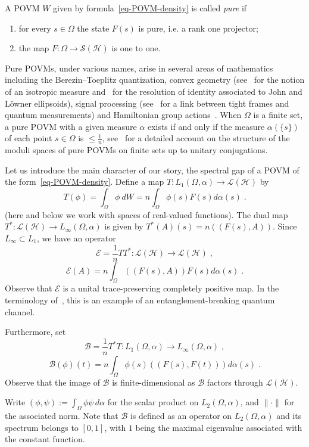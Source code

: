 \documentclass[11pt]{article}
\theoremstyle{definition}
\numberwithin{equation}{section}
\numberwithin{figure}{section}
\numberwithin{table}{section}
\newcommand{\cB}{{\mathcal{B}}}
\newcommand{\cE}{{\mathcal{E}}}
\newcommand{\cS}{{\mathcal{S}}}
\newcommand{\Hilb}{\mathcal{H}}
\renewcommand\leq {\leqslant}
\newcommand\< {\mathcal{h}}
\renewcommand\> {\mathcal{i}}
\newcommand*\cL{\mathscr{L}}
\newcommand*{\romanenumi}{\renewcommand*{\theenumi}{\roman{enumi}}}
\begin{document}
A POVM $W$ given by formula~\eqref{eq-POVM-density} is called \emph{pure} if
\begin{enumerate}\romanenumi
\item \label{list2.1}for every $s \in \Omega$ the state $F(s)$ is pure, i.e. a rank one projector;
\item \label{list2.2}the map $F:\Omega \to \cS(\Hilb)$ is one to one.
\end{enumerate}
Pure POVMs, under various names, arise in several areas of mathematics including the Berezin--Toeplitz quantization, convex geometry (see~\cite{GM} for the notion of an isotropic measure and~\cite{AS} for the resolution of identity associated to John and L\"owner ellipsoids), signal processing (see~\cite{EF} for a link between tight frames and quantum measurements) and Hamiltonian group actions~\cite{FM}. When $\Omega$ is a finite set, a pure POVM with a given measure $\alpha$ exists if and only if the measure $\alpha(\{s\})$ of each point $s \in \Omega$ is $\leq \frac{1}{n}$, see~\cite{FM} for a detailed account on the structure of the moduli spaces of pure POVMs on finite sets up to unitary conjugations.

Let us introduce the main character of our story, the spectral gap of a POVM of the form~\eqref{eq-POVM-density}. Define a map $T: L_1(\Omega, \alpha) \to \cL(\Hilb)$ by
\[
T(\phi)= \int_\Omega \phi\ dW = n\int_\Omega \phi(s) F(s) d\alpha(s)\;.
\]
(here and below we work with spaces of real-valued functions). The dual map $T^*: \cL(\Hilb) \to L_{\infty} (\Omega, \alpha)$ is given by $T^*(A)(s) = n((F(s),A))$. Since $L_\infty \subset L_1$, we have an operator
\[
\cE= \frac{1}{n}TT^*: \cL(\Hilb) \to \cL(\Hilb)\;,
\]
\begin{equation}\label{eq-e}
\cE(A) = n\int_{\Omega} ((F(s),A))F(s) d\alpha(s)\;.
\end{equation}
Observe that $\cE$ is a unital trace-preserving completely positive map. In the terminology of~\cite[Example~5.4]{Hayashi}, this is an example of an entanglement-breaking quantum channel.

Furthermore, set
\[
\cB=\frac{1}{n}T^*T: L_1(\Omega,\alpha) \to L_\infty(\Omega,\alpha)\;,
\]
\begin{equation}\label{eq-b}
\cB(\phi)(t)= n\int_\Omega \phi(s)((F(s),F(t))) d\alpha(s)\;.
\end{equation}
Observe that the image of $\cB$ is finite-dimensional as $\cB$ factors through $\cL(\Hilb)$.

Write $(\phi,\psi):= \int_\Omega \phi\psi\, d\alpha$ for the scalar product on $L_2(\Omega,\alpha)$, and $\|\cdot\|$ for the associated norm. Note that $\cB$ is defined as an operator on $L_2(\Omega,\alpha)$ and its spectrum belongs to $[0,1]$, with $1$ being the maximal eigenvalue associated with the constant function.
\end{document}
